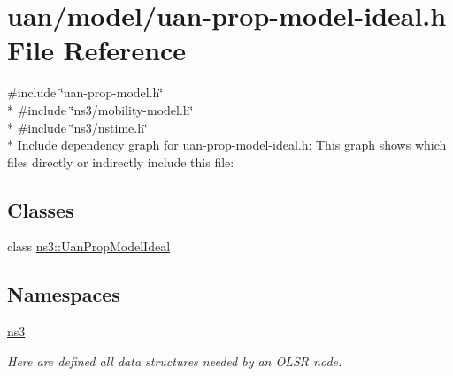 \hypertarget{uan-prop-model-ideal_8h}{}\section{uan/model/uan-\/prop-\/model-\/ideal.h File Reference}
\label{uan-prop-model-ideal_8h}
{\ttfamily \#include \char`\"{}uan-\/prop-\/model.\+h\char`\"{}}\\*
{\ttfamily \#include \char`\"{}ns3/mobility-\/model.\+h\char`\"{}}\\*
{\ttfamily \#include \char`\"{}ns3/nstime.\+h\char`\"{}}\\*
Include dependency graph for uan-\/prop-\/model-\/ideal.h\+:
This graph shows which files directly or indirectly include this file\+:
\subsection*{Classes}
\begin{DoxyCompactItemize}
\item 
class \hyperlink{classns3_1_1UanPropModelIdeal}{ns3\+::\+Uan\+Prop\+Model\+Ideal}
\end{DoxyCompactItemize}
\subsection*{Namespaces}
\begin{DoxyCompactItemize}
\item 
 \hyperlink{namespacens3}{ns3}
\begin{DoxyCompactList}\small\item\em Here are defined all data structures needed by an O\+L\+SR node. \end{DoxyCompactList}\end{DoxyCompactItemize}
